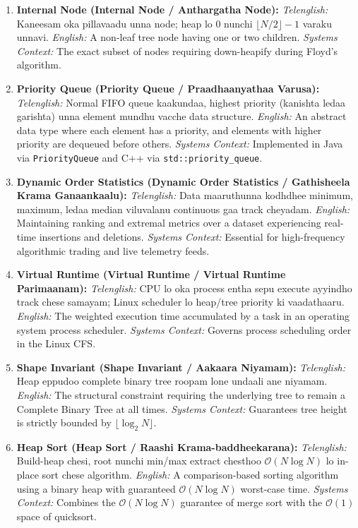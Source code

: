 \documentclass[10pt,twocolumn,letterpaper]{article}
\begin{document}
\begin{enumerate}
    \item \textbf{Internal Node (Internal Node / Anthargatha Node):}
    \textit{Telenglish:} Kaneesam oka pillavaadu unna node; heap lo $0$ nunchi $\lfloor N/2 \rfloor - 1$ varaku unnavi.
    \textit{English:} A non-leaf tree node having one or two children.
    \textit{Systems Context:} The exact subset of nodes requiring down-heapify during Floyd's algorithm.

    \item \textbf{Priority Queue (Priority Queue / Praadhaanyathaa Varusa):}
    \textit{Telenglish:} Normal FIFO queue kaakundaa, highest priority (kanishta ledaa garishta) unna element mundhu vacche data structure.
    \textit{English:} An abstract data type where each element has a priority, and elements with higher priority are dequeued before others.
    \textit{Systems Context:} Implemented in Java via \texttt{PriorityQueue} and C++ via \texttt{std::priority\_queue}.

    \item \textbf{Dynamic Order Statistics (Dynamic Order Statistics / Gathisheela Krama Ganaankaalu):}
    \textit{Telenglish:} Data maaruthunna kodhdhee minimum, maximum, ledaa median viluvalanu continuous gaa track cheyadam.
    \textit{English:} Maintaining ranking and extremal metrics over a dataset experiencing real-time insertions and deletions.
    \textit{Systems Context:} Essential for high-frequency algorithmic trading and live telemetry feeds.

    \item \textbf{Virtual Runtime (Virtual Runtime / Virtual Runtime Parimaanam):}
    \textit{Telenglish:} CPU lo oka process entha sepu execute ayyindho track chese samayam; Linux scheduler lo heap/tree priority ki vaadathaaru.
    \textit{English:} The weighted execution time accumulated by a task in an operating system process scheduler.
    \textit{Systems Context:} Governs process scheduling order in the Linux CFS.

    \item \textbf{Shape Invariant (Shape Invariant / Aakaara Niyamam):}
    \textit{Telenglish:} Heap eppudoo complete binary tree roopam lone undaali ane niyamam.
    \textit{English:} The structural constraint requiring the underlying tree to remain a Complete Binary Tree at all times.
    \textit{Systems Context:} Guarantees tree height is strictly bounded by $\lfloor \log_2 N \rfloor$.

    \item \textbf{Heap Sort (Heap Sort / Raashi Krama-baddheekarana):}
    \textit{Telenglish:} Build-heap chesi, root nunchi min/max extract chesthoo $\mathcal{O}(N \log N)$ lo in-place sort chese algorithm.
    \textit{English:} A comparison-based sorting algorithm using a binary heap with guaranteed $\mathcal{O}(N \log N)$ worst-case time.
    \textit{Systems Context:} Combines the $\mathcal{O}(N \log N)$ guarantee of merge sort with the $\mathcal{O}(1)$ space of quicksort.
\end{enumerate}
\end{document}
